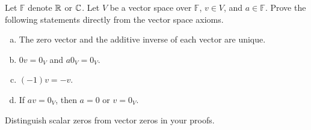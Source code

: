 \begin{exercise}
  \label{ex:hw01:axiom-consequences}
  Let \(\mathbb F\) denote \(\mathbb{R}\) or \(\mathbb{C}\). Let \(V\) be a vector
  space over \(\mathbb F\), \(v\in V\), and \(a\in\mathbb F\).
  Prove the following statements directly from the vector space axioms.
  \begin{enumerate}[(a)][2]
    \item The zero vector and the additive inverse of each vector are unique.
    \item \(0v=0_V\) and \(a0_V=0_V\).
    \item \((-1)v=-v\).
    \item If \(av=0_V\), then \(a=0\) or \(v=0_V\).
  \end{enumerate}
  Distinguish scalar zeros from vector zeros in your proofs.
\end{exercise}
